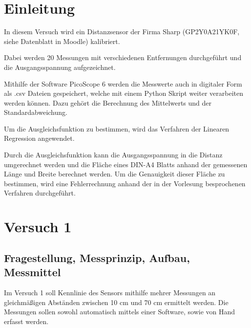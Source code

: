 \documentclass[12pt, oneside, a4paper, \docLanguage]{report}
\begin{document}

\setcounter{section}{0}



\clearpage

%
%


%
%


%
%


%
%




\setcounter{page}{1} 
\pagestyle{default}
%
%
\chapter{Einleitung}
\label{chap:EINL}
In diesem Versuch wird ein Distanzsensor der Firma Sharp (GP2Y0A21YK0F, siehe Datenblatt in Moodle) kalibriert.

Dabei werden 20 Messungen mit verschiedenen Entfernungen durchgeführt und die Ausgangsspannung aufgezeichnet. 

Mithilfe der Software PicoScope 6 werden die Messwerte auch in digitaler Form als .csv Dateien gespeichert, welche mit einem Python Skript weiter verarbeiten werden können. Dazu gehört die Berechnung des Mittelwerts und der Standardabweichung.

Um die Ausgleichsfunktion zu bestimmen, wird das Verfahren der Linearen Regression angewendet.

Durch die Ausgleichsfunktion kann die Ausgangsspannung in die Distanz umgerechnet werden und die Fläche eines DIN-A4 Blatts anhand der gemessenen Länge und Breite berechnet werden. Um die Genauigkeit dieser Fläche zu bestimmen, wird eine Fehlerrechnung anhand der in der Vorlesung besprochenen Verfahren durchgeführt.
%
%
\chapter{Versuch 1}
\label{chap:VERSUCH_1}

\section{Fragestellung, Messprinzip, Aufbau, Messmittel}
\label{chap:VERSUCH_1_FRAGESTELLUNG}
Im Versuch 1 soll Kennlinie des Sensors mithilfe mehrer Messungen an gleichmäßigen Abständen zwischen 10 cm und 70 cm ermittelt werden. Die Messungen sollen sowohl automatisch mittels einer Software, sowie von Hand erfasst werden.
\end{document}

